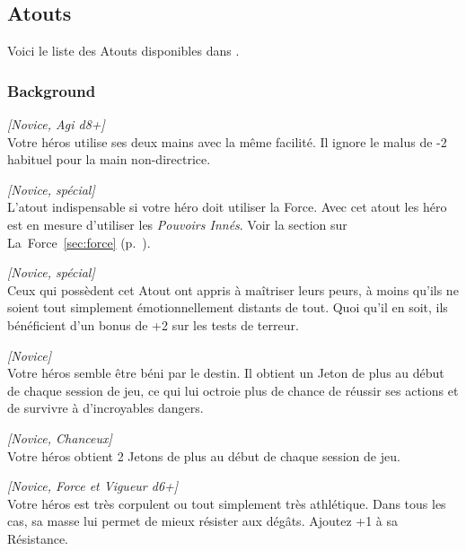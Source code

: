 \subsection{Atouts}

Voici le liste des Atouts disponibles dans \swfe.

\subsubsection{Background}
\begin{description}[align=left]
    \item [Ambidextre]
    	\emph{[Novice, Agi d8+]}\\
        Votre héros utilise ses deux mains avec la même facilité. Il ignore le malus de -2 habituel pour la main non-directrice.

    \item [Arcane (Force)]
    	\emph{[Novice, spécial]}\\
        L’atout indispensable si votre héro doit utiliser la Force. Avec cet atout les héro est en mesure d’utiliser les \emph{Pouvoirs Innés}. Voir la section sur La~Force~\ref{sec:force} (p.~\pageref{sec:force}).

    \item [Brave]
    	\emph{[Novice, spécial]}\\
        Ceux qui possèdent cet Atout ont appris à maîtriser leurs peurs, à moins qu’ils ne soient tout simplement émotionnellement distants de tout. Quoi qu’il en soit, ils bénéficient d’un bonus de +2 sur les tests de terreur.

    \item [Chanceux]
    	\emph{[Novice]}\\
        Votre héros semble être béni par le destin. Il obtient un Jeton de plus au début de chaque session de jeu, ce qui lui octroie plus de chance de réussir ses actions et de survivre à d’incroyables dangers.

    \item [Très Chanceux]
    	\emph{[Novice, Chanceux]}\\
        Votre héros obtient 2 Jetons de plus au début de chaque session de jeu.

    \item [Costaud]
    	\emph{[Novice, Force et Vigueur d6+]}\\
        Votre héros est très corpulent ou tout simplement très athlétique. Dans tous les cas, sa masse lui permet de mieux résister aux dégâts. Ajoutez +1 à sa Résistance.


\end{description}

